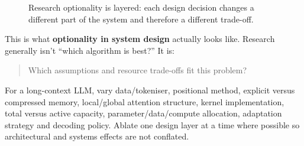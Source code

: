 \begin{figure}[htbp]
\centering
{}
\caption{Research optionality is layered: each design decision changes a different part of the system and therefore a different trade-off.}
\label{fig:modern-research-project-optionality}
\end{figure}

This is what \textbf{optionality in system design} actually looks like.
Research generally isn't ``which algorithm is best?''
It is:

\begin{quote}
Which assumptions and resource trade-offs fit this problem?
\end{quote}

\begin{calloutdegreeofexperiment}
For a long-context LLM, vary data/tokeniser, positional method, explicit versus compressed memory, local/global attention structure, kernel implementation, total versus active capacity, parameter/data/compute allocation, adaptation strategy and decoding policy.
Ablate one design layer at a time where possible so architectural and systems effects are not conflated.
\end{calloutdegreeofexperiment}

